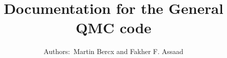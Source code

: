 \documentclass[10pt,Arial]{article}
\begin{document}
\title{Documentation for the General QMC code}
\author{Authors:~Martin Bercx and Fakher F. Assaad}
\maketitle
\tableofcontents
\clearpage






%
%
%

%
%
%
%
\end{document}

